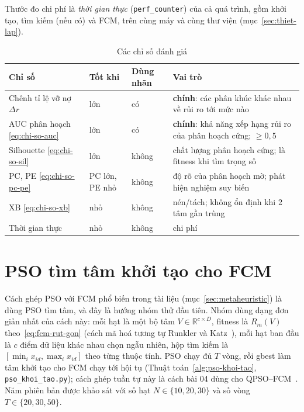 Thước đo chi phí là \emph{thời gian thực} (\texttt{perf\_counter}) của cả quá trình, gồm khởi tạo, tìm kiếm (nếu có) và FCM,
trên cùng máy và cùng thư viện (mục~\ref{sec:thiet-lap}).

\begin{table}[htbp]
\centering
\caption{Các chỉ số đánh giá}
\label{tab:ch2-chi-so}
\footnotesize
\setlength{\tabcolsep}{4pt}
\begin{tabular}{@{}>{\raggedright\arraybackslash}p{3.8cm}>{\raggedright\arraybackslash}p{1.6cm}>{\raggedright\arraybackslash}p{1.4cm}>{\raggedright\arraybackslash}p{7.6cm}@{}}
\toprule
Chỉ số & Tốt khi & Dùng nhãn & Vai trò \\
\midrule
Chênh tỉ lệ vỡ nợ $\Delta r$ & lớn & có & \textbf{chính}: các phân khúc khác nhau về rủi ro tới mức nào \\
AUC phân hoạch \eqref{eq:chi-so-auc} & lớn & có & \textbf{chính}: khả năng xếp hạng rủi ro của phân hoạch cứng; $\ge 0{,}5$ \\
Silhouette \eqref{eq:chi-so-sil} & lớn & không & chất lượng phân hoạch cứng; là fitness khi tìm trọng số \\
PC, PE \eqref{eq:chi-so-pc-pe} & PC lớn, PE nhỏ & không & độ rõ của phân hoạch mờ; phát hiện nghiệm suy biến \\
XB \eqref{eq:chi-so-xb} & nhỏ & không & nén/tách; không ổn định khi 2 tâm gần trùng \\
Thời gian thực & nhỏ & không & chi phí \\
\bottomrule
\end{tabular}
\end{table}


\section{PSO tìm tâm khởi tạo cho FCM}
\label{sec:pso-khoi-tao}

Cách ghép PSO với FCM phổ biến trong tài liệu (mục~\ref{sec:metaheuristic}) là dùng PSO tìm tâm, và đây là hướng nhóm thử
đầu tiên. Nhóm dùng dạng đơn giản nhất của cách này: mỗi hạt là một bộ tâm $V \in \mathbb{R}^{c \times D}$, fitness là
$R_m(V)$ theo~\eqref{eq:fcm-rut-gon} (cách mã hoá tương tự Runkler và Katz~\cite{runkler2006psofcm}), mỗi hạt ban đầu là $c$
điểm dữ liệu khác nhau chọn ngẫu nhiên, hộp tìm kiếm là $[\min_i x_{id}, \max_i x_{id}]$ theo từng thuộc tính. PSO chạy đủ
$T$ vòng, rồi gbest làm tâm khởi tạo cho FCM chạy tới hội tụ (Thuật toán~\ref{alg:pso-khoi-tao}, \texttt{pso\_khoi\_tao.py});
cách ghép tuần tự này là cách bài 04 dùng cho QPSO--FCM~\cite{zhang2025qpsofcm}. Năm phiên bản được khảo sát với số hạt
$N \in \{10, 20, 30\}$ và số vòng $T \in \{20, 30, 50\}$.

